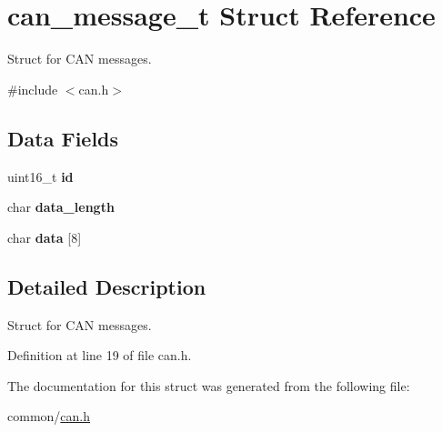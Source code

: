 \hypertarget{structcan__message__t}{}\section{can\+\_\+message\+\_\+t Struct Reference}
\label{structcan__message__t}


Struct for C\+AN messages.  




{\ttfamily \#include $<$can.\+h$>$}

\subsection*{Data Fields}
\begin{DoxyCompactItemize}
\item 
\mbox{\label{structcan__message__t_ac5d7e171bc59d6e5ead8957faa1259a6}} 
uint16\+\_\+t {\bfseries id}
\item 
\mbox{\label{structcan__message__t_ab3769058723c86113dc6d4d7c8cf2ec0}} 
char {\bfseries data\+\_\+length}
\item 
\mbox{\label{structcan__message__t_a519019132ffdcd9fe783b12c4f280c57}} 
char {\bfseries data} \mbox{[}8\mbox{]}
\end{DoxyCompactItemize}


\subsection{Detailed Description}
Struct for C\+AN messages. 

Definition at line 19 of file can.\+h.



The documentation for this struct was generated from the following file\+:\begin{DoxyCompactItemize}
\item 
common/\hyperlink{can_8h}{can.\+h}\end{DoxyCompactItemize}

